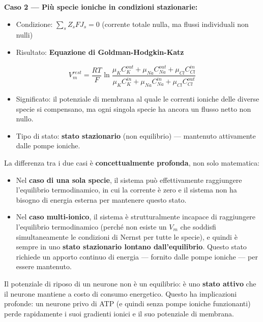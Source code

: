\textbf{Caso 2 — Più specie ioniche in condizioni stazionarie:}
\begin{itemize}
    \item Condizione: $\sum_s Z_s F J_s = 0$ (corrente totale nulla, ma flussi individuali non nulli)
    \item Risultato: \textbf{Equazione di Goldman-Hodgkin-Katz}
\end{itemize}

\begin{equation}
V_m^{rest} = \frac{RT}{F} \ln \frac{\mu_K C_K^{out} + \mu_{Na} C_{Na}^{out} + \mu_{Cl} C_{Cl}^{in}}{\mu_K C_K^{in} + \mu_{Na} C_{Na}^{in} + \mu_{Cl} C_{Cl}^{out}}
\end{equation}

\begin{itemize}
    \item Significato: il potenziale di membrana al quale le correnti ioniche delle diverse specie si compensano, ma ogni singola specie ha ancora un flusso netto non nullo.
    \item Tipo di stato: \textbf{stato stazionario} (non equilibrio) — mantenuto attivamente dalle pompe ioniche.
\end{itemize}


La differenza tra i due casi è \textbf{concettualmente profonda}, non solo matematica:

\begin{itemize}
    \item Nel \textbf{caso di una sola specie}, il sistema può effettivamente raggiungere l'equilibrio termodinamico, in cui la corrente è zero e il sistema non ha bisogno di energia esterna per mantenere questo stato.
    \item Nel \textbf{caso multi-ionico}, il sistema è strutturalmente incapace di raggiungere l'equilibrio termodinamico (perché non esiste un $V_m$ che soddisfi simultaneamente le condizioni di Nernst per tutte le specie), e quindi è sempre in uno \textbf{stato stazionario lontano dall'equilibrio}. Questo stato richiede un apporto continuo di energia — fornito dalle pompe ioniche — per essere mantenuto.
\end{itemize}

Il potenziale di riposo di un neurone non è un equilibrio: è uno \textbf{stato attivo} che il neurone mantiene a costo di consumo energetico. Questo ha implicazioni profonde: un neurone privo di ATP (e quindi senza pompe ioniche funzionanti) perde rapidamente i suoi gradienti ionici e il suo potenziale di membrana.



